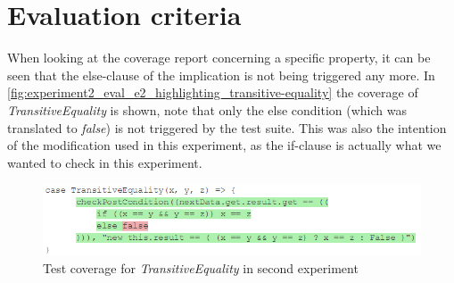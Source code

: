 \section{Evaluation criteria}
When looking at the coverage report concerning a specific property, it can be seen that the else-clause of the implication is not being triggered any more. In \autoref{fig:experiment2_eval_e2_highlighting_transitive-equality} the coverage of \textit{TransitiveEquality} is shown, note that only the else condition (which was translated to \textit{false}) is not triggered by the test suite. This was also the intention of the modification used in this experiment, as the if-clause is actually what we wanted to check in this experiment.
\FloatBarrier
\begin{figure}[!ht]
	\includegraphics[width=\linewidth]{figures/eval_e2_transitive-equality}
\caption{Test coverage for \textit{TransitiveEquality} in second experiment}
\label{fig:experiment2_eval_e2_highlighting_transitive-equality}
\centering
\end{figure}
\FloatBarrier

